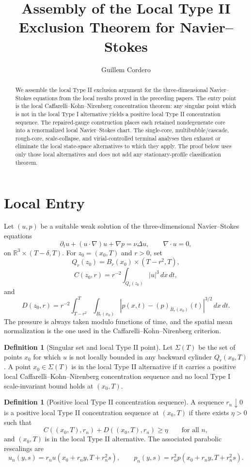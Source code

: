 \documentclass[11pt]{amsart}
\title[Assembly of the Local Type II Exclusion]
{Assembly of the Local Type II Exclusion Theorem for Navier--Stokes}
\author{Guillem Cordero}
\date{}
\theoremstyle{plain}
\theoremstyle{definition}
\newtheorem{definition}[theorem]{Definition}
\theoremstyle{remark}
\begin{document}
\begin{abstract}
We assemble the local Type II exclusion argument for the three-dimensional
Navier--Stokes equations from the local results proved in the preceding papers.
The entry point is the local Caffarelli--Kohn--Nirenberg concentration theorem:
any singular point which is not in the local Type I alternative yields a
positive local Type II concentration sequence.  The repaired-gauge construction
places each retained nondegenerate core into a renormalized local Navier--Stokes
chart.  The single-core, multibubble/cascade, rough-core, scale-collapse, and
virial-controlled terminal analyses then exhaust or eliminate the local
state-space alternatives to which they apply.  The proof below uses only those
local alternatives and does not add any stationary-profile classification
theorem.
\end{abstract}

\maketitle

\section{Local Entry}

Let \((u,p)\) be a suitable weak solution of the three-dimensional
Navier--Stokes equations
\[
  \partial_tu+(u\cdot\nabla)u+\nabla p=\nu\Delta u,
  \qquad \nabla\cdot u=0,
\]
on \(\mathbb R^3\times(T-\delta,T)\).  For \(z_0=(x_0,T)\) and \(r>0\), set
\[
  Q_r(z_0)=B_r(x_0)\times(T-r^2,T),
\]
\[
  C(z_0,r)=r^{-2}\int_{Q_r(z_0)}|u|^3\,dx\,dt,
\]
and
\[
  D(z_0,r)=r^{-2}\int_{T-r^2}^{T}\int_{B_r(x_0)}
  |p(x,t)-(p)_{B_r(x_0)}(t)|^{3/2}\,dx\,dt.
\]
The pressure is always taken modulo functions of time, and the spatial mean
normalization is the one used in the Caffarelli--Kohn--Nirenberg criterion.

\begin{definition}[Singular set and local Type II point]
Let \(\Sigma(T)\) be the set of points \(x_0\) for which \(u\) is not locally
bounded in any backward cylinder \(Q_r(x_0,T)\).  A point \(x_0\in\Sigma(T)\)
is in the local Type II alternative if it carries a positive local
Caffarelli--Kohn--Nirenberg concentration sequence and no local Type I
scale-invariant bound holds at \((x_0,T)\).
\end{definition}

\begin{definition}[Positive local Type II concentration sequence]
\label{def:local-typeII-sequence}
A sequence \(r_n\downarrow0\) is a positive local Type II concentration sequence
at \((x_0,T)\) if there exists \(\eta>0\) such that
\[
  C((x_0,T),r_n)+D((x_0,T),r_n)\ge \eta
  \qquad\text{for all }n,
\]
and \((x_0,T)\) is in the local Type II alternative.  The associated parabolic
rescalings are
\[
  u_n(y,s)=r_nu(x_0+r_ny,T+r_n^2s),
  \qquad
  p_n(y,s)=r_n^2p(x_0+r_ny,T+r_n^2s).
\]
\end{definition}
\end{document}

